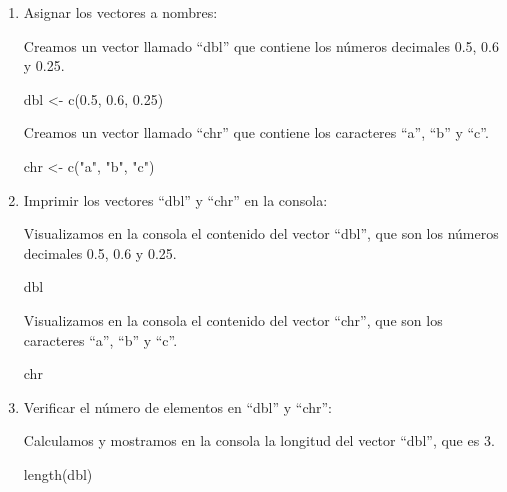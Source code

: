 \documentclass[
  letterpaper,
  DIV=11,
  numbers=noendperiod]{scrartcl}
\newenvironment{Shaded}{}{}
\newcommand{\FloatTok}[1]{\textcolor[rgb]{0.00,0.36,0.77}{#1}}
\newcommand{\FunctionTok}[1]{\textcolor[rgb]{0.44,0.26,0.76}{#1}}
\newcommand{\NormalTok}[1]{\textcolor[rgb]{0.14,0.16,0.18}{#1}}
\newcommand{\OtherTok}[1]{\textcolor[rgb]{0.44,0.26,0.76}{#1}}
\newcommand{\StringTok}[1]{\textcolor[rgb]{0.01,0.18,0.38}{#1}}
\begin{document}
\begin{enumerate}
\def\labelenumi{\arabic{enumi}.}
\item
  Asignar los vectores a nombres:

  Creamos un vector llamado ``dbl'' que contiene los números decimales
  0.5, 0.6 y 0.25.

\begin{Shaded}
\begin{Highlighting}[]
\NormalTok{dbl }\OtherTok{\textless{}{-}} \FunctionTok{c}\NormalTok{(}\FloatTok{0.5}\NormalTok{, }\FloatTok{0.6}\NormalTok{, }\FloatTok{0.25}\NormalTok{)}
\end{Highlighting}
\end{Shaded}

  Creamos un vector llamado ``chr'' que contiene los caracteres ``a'',
  ``b'' y ``c''.

\begin{Shaded}
\begin{Highlighting}[]
\NormalTok{chr }\OtherTok{\textless{}{-}} \FunctionTok{c}\NormalTok{(}\StringTok{"a"}\NormalTok{, }\StringTok{"b"}\NormalTok{, }\StringTok{"c"}\NormalTok{)}
\end{Highlighting}
\end{Shaded}
\item
  Imprimir los vectores ``dbl'' y ``chr'' en la consola:

  Visualizamos en la consola el contenido del vector ``dbl'', que son
  los números decimales 0.5, 0.6 y 0.25.

\begin{Shaded}
\begin{Highlighting}[]
\NormalTok{dbl}
\end{Highlighting}
\end{Shaded}

  Visualizamos en la consola el contenido del vector ``chr'', que son
  los caracteres ``a'', ``b'' y ``c''.

\begin{Shaded}
\begin{Highlighting}[]
\NormalTok{chr}
\end{Highlighting}
\end{Shaded}
\item
  Verificar el número de elementos en ``dbl'' y ``chr'':

  Calculamos y mostramos en la consola la longitud del vector ``dbl'',
  que es 3.

\begin{Shaded}
\begin{Highlighting}[]
\FunctionTok{length}\NormalTok{(dbl)}
\end{Highlighting}
\end{Shaded}


\end{enumerate}
\end{document}
